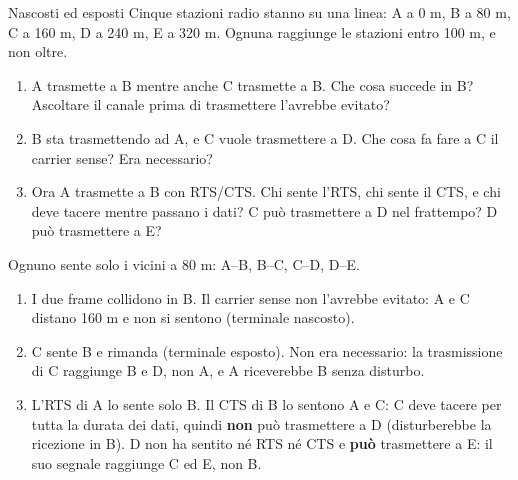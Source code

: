 \begin{esercizio}{Nascosti ed esposti}
Cinque stazioni radio stanno su una linea: A a 0 m, B a 80 m, C a 160 m, D a 240 m, E a 320 m. Ognuna raggiunge le stazioni entro 100 m, e
non oltre.
\begin{enumerate}[label=(\alph*)]
    \item A trasmette a B mentre anche C trasmette a B. Che cosa succede in B? Ascoltare il canale prima di trasmettere l'avrebbe evitato?
    \item B sta trasmettendo ad A, e C vuole trasmettere a D. Che cosa fa fare a C il carrier sense? Era necessario?
    \item Ora A trasmette a B con RTS/CTS. Chi sente l'RTS, chi sente il CTS, e chi deve tacere mentre passano i dati? C può trasmettere a D
          nel frattempo? D può trasmettere a E?
\end{enumerate}

\svolgimento
Ognuno sente solo i vicini a 80 m: A--B, B--C, C--D, D--E.
\begin{enumerate}[label=(\alph*)]
    \item I due frame collidono in B. Il carrier sense non l'avrebbe evitato: A e C distano 160 m e non si sentono (terminale nascosto).
    \item C sente B e rimanda (terminale esposto). Non era necessario: la trasmissione di C raggiunge B e D, non A, e A riceverebbe B senza
          disturbo.
    \item L'RTS di A lo sente solo B. Il CTS di B lo sentono A e C: C deve tacere per tutta la durata dei dati, quindi \textbf{non} può
          trasmettere a D (disturberebbe la ricezione in B). D non ha sentito né RTS né CTS e \textbf{può} trasmettere a E: il suo segnale
          raggiunge C ed E, non B.
\end{enumerate}
\end{esercizio}

